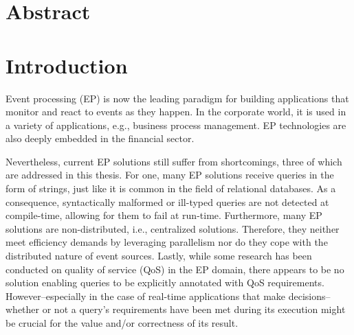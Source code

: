 \documentclass[article, type=bsc, colorback, accentcolor=tud8b, parskip=half, bibliography=totocnumbered]{tudthesis}
\begin{document}
\author{Lucas Bärenfänger}

\makethesistitle


\tableofcontents

\newpage

\section{Abstract}
\label{sec:abstract}

\newpage

\section{Introduction}
\label{sec:introduction}

Event processing (EP) is now the leading paradigm for building applications that monitor and react to events as they happen.
In the corporate world, it is used in a variety of applications, e.g., business process management.
EP technologies are also deeply embedded in the financial sector.

Nevertheless, current EP solutions still suffer from shortcomings, three of which are addressed in this thesis.
For one, many EP solutions receive queries in the form of strings, just like it is common in the field of relational databases.
As a consequence, syntactically malformed or ill-typed queries are not detected at compile-time, allowing for them to fail at run-time.
Furthermore, many EP solutions are non-distributed, i.e., centralized solutions.
Therefore, they neither meet efficiency demands by leveraging parallelism nor do they cope with the distributed nature of event sources.
Lastly, while some research has been conducted on quality of service (QoS) in the EP domain, there appears to be no solution enabling queries to be explicitly annotated with QoS requirements.
However--especially in the case of real-time applications that make decisions--whether or not a query's requirements have been met during its execution might be crucial for the value and/or correctness of its result.
\end{document}
